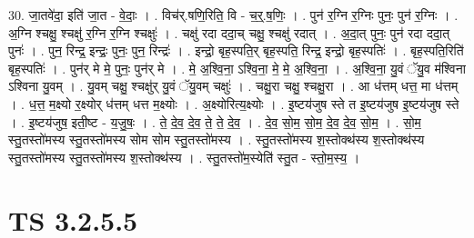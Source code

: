 \documentclass[17pt]{extarticle}
\begin{document}
30. जा॒तवे॑दा॒ इति॑ जा॒त - वे॒दाः॒ । . विच॑र्.षणि॒रिति॒ वि - च॒र्॒.ष॒णिः॒ । . पुन॑ र॒ग्नि र॒ग्निः पुनः॒ पुन॑ र॒ग्निः । . अ॒ग्नि श्चक्षु॒ श्चक्षु॑ र॒ग्नि र॒ग्नि श्चक्षुः॑ । . चक्षु॑ रदा ददा॒च् चक्षु॒ श्चक्षु॑ रदात् । . अ॒दा॒त् पुनः॒ पुन॑ रदा ददा॒त् पुनः॑ । . पुन॒ रिन्द्र॒ इन्द्रः॒ पुनः॒ पुन॒ रिन्द्रः॑ । . इन्द्रो॒ बृह॒स्पति॒र् बृह॒स्पति॒ रिन्द्र॒ इन्द्रो॒ बृह॒स्पतिः॑ । . बृह॒स्पति॒रिति॑ बृह॒स्पतिः॑ । . पुन॑र् मे मे॒ पुनः॒ पुन॑र् मे । . मे॒ अ॒श्वि॒ना॒ ऽश्वि॒ना॒ मे॒ मे॒ अ॒श्वि॒ना॒ । . अ॒श्वि॒ना॒ यु॒वं ॅयु॒व म॑श्विना ऽश्विना यु॒वम् । . यु॒वम् चक्षु॒ श्चक्षु॑र् यु॒वं ॅयु॒वम् चक्षुः॑ । . चक्षु॒रा चक्षु॒ श्चक्षु॒रा । . आ ध॑त्तम् धत्त॒ मा ध॑त्तम् । . ध॒त्त॒ म॒क्ष्यो र॒क्ष्योर् ध॑त्तम् धत्त म॒क्ष्योः । . अ॒क्ष्योरित्य॒क्ष्योः । . इ॒ष्टय॑जुष स्ते त इ॒ष्टय॑जुष इ॒ष्टय॑जुष स्ते । . इ॒ष्टय॑जुष॒ इती॒ष्ट - य॒जु॒षः॒ । . ते॒ दे॒व॒ दे॒व॒ ते॒ ते॒ दे॒व॒ । . दे॒व॒ सो॒म॒ सो॒म॒ दे॒व॒ दे॒व॒ सो॒म॒ । . सो॒म॒ स्तु॒तस्तो॑मस्य स्तु॒तस्तो॑मस्य सोम सोम स्तु॒तस्तो॑मस्य । . स्तु॒तस्तो॑मस्य श॒स्तोक्थ॑स्य श॒स्तोक्थ॑स्य स्तु॒तस्तो॑मस्य स्तु॒तस्तो॑मस्य श॒स्तोक्थ॑स्य । . स्तु॒तस्तो॑म॒स्येति॑ स्तु॒त - स्तो॒म॒स्य॒ । \newline


\section{ TS 3.2.5.5 }
\end{document}
